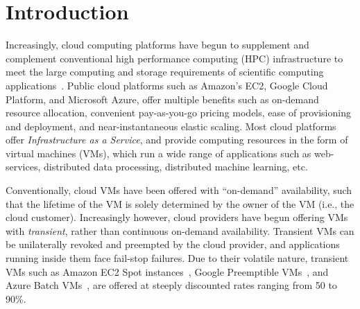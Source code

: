 \section{Introduction}
\label{sec:intro}








Increasingly, cloud computing platforms have begun to supplement and complement conventional high performance computing (HPC)  infrastructure  to meet the large computing and storage requirements of scientific computing applications~\cite{buyya-hpc-survey}. 
Public cloud platforms such as Amazon's EC2, Google Cloud Platform, and Microsoft Azure, offer multiple benefits such as on-demand resource allocation, convenient pay-as-you-go pricing models, ease of provisioning and deployment, and near-instantaneous elastic scaling. 
Most cloud platforms offer \emph{Infrastructure as a Service}, and provide computing resources in the form of virtual machines (VMs),  which run a wide range of applications such as web-services, distributed data processing, distributed machine learning, etc.



Conventionally, cloud VMs have been offered with ``on-demand'' availability, such that the lifetime of the VM is solely determined by the owner of the VM (i.e., the cloud customer). 
Increasingly however, cloud providers have begun offering VMs with \emph{transient}, rather than continuous on-demand availability. 
Transient VMs can be unilaterally revoked and preempted by the cloud provider, and applications running inside them face fail-stop failures. 
Due to their volatile nature, transient VMs such as Amazon EC2 Spot instances~\cite{spot-documentation}, Google Preemptible VMs~\cite{preemptible-documentation}, and Azure Batch VMs~\cite{azure-batch}, are offered at steeply discounted rates ranging from 50 to 90\%.

